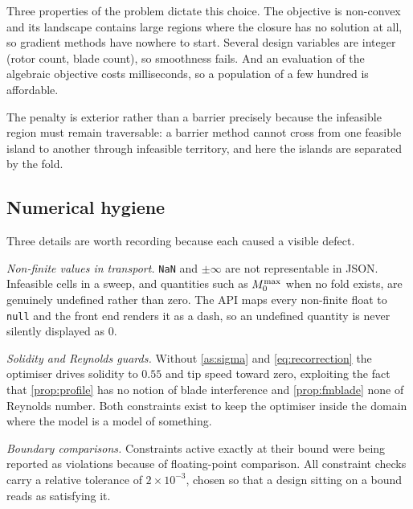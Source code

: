 Three properties of the problem dictate this choice. The objective is
non-convex and its landscape contains large regions where the closure has no
solution at all, so gradient methods have nowhere to start. Several design
variables are integer (rotor count, blade count), so smoothness fails. And an
evaluation of the algebraic objective costs milliseconds, so a population of a
few hundred is affordable.

The penalty is exterior rather than a barrier precisely because the infeasible
region must remain traversable: a barrier method cannot cross from one feasible
island to another through infeasible territory, and here the islands are
separated by the fold.

\subsection{Numerical hygiene}

Three details are worth recording because each caused a visible defect.

\emph{Non-finite values in transport.} \texttt{NaN} and $\pm\infty$ are not
representable in JSON. Infeasible cells in a sweep, and quantities such as
$M_0^{\max}$ when no fold exists, are genuinely undefined rather than zero. The API
maps every non-finite float to \texttt{null} and the front end renders it as a
dash, so an undefined quantity is never silently displayed as $0$.

\emph{Solidity and Reynolds guards.} Without \cref{as:sigma} and
\cref{eq:recorrection} the optimiser drives solidity to $0.55$ and tip speed
toward zero, exploiting the fact that \cref{prop:profile} has no notion of
blade interference and \cref{prop:fmblade} none of Reynolds number. Both
constraints exist to keep the optimiser inside the domain where the model is a
model of something.

\emph{Boundary comparisons.} Constraints active exactly at their bound were
being reported as violations because of floating-point comparison. All
constraint checks carry a relative tolerance of $2\times10^{-3}$, chosen so
that a design sitting on a bound reads as satisfying it.
